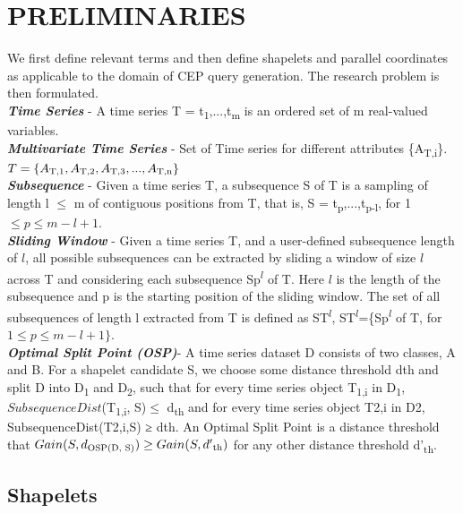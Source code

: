 \documentclass[letterpaper, 10 pt, conference]{IEEEtran}  %
\begin{document}
\section{PRELIMINARIES}
We first define relevant terms and then define shapelets and parallel coordinates as applicable to the domain of CEP query generation. The research problem is then formulated.
\medskip\\
\textbf{\textit{Time Series}} - A time series T = t\textsubscript{1},...,t\textsubscript{m} is an ordered set of m real-valued variables.\\ 
\textbf{\textit{Multivariate Time Series}} - Set of Time series for different attributes \{A\textsubscript{T,i}\}. \(T = \{A\textsubscript{T,1},A\textsubscript{T,2},A\textsubscript{T,3},...,A\textsubscript{T,n}\}\)\\
\textbf{\textit{Subsequence}} - Given a time series T, a subsequence S of T is a sampling of length l \(\leq\) m of contiguous positions from T, that is, S = t\textsubscript{p},...,t\textsubscript{p-l}, for 1 \(\leq p \leq m - l + 1\).\\
\textbf{\textit{Sliding Window}} - Given a time series T, and a user-defined subsequence length of \(l\), all possible subsequences can be extracted by sliding a window of size  \(l\) across T and considering each subsequence Sp\textsuperscript{\(l\)} of T. Here \(l\) is the length of the subsequence and p is the starting position of the sliding window. The set of all subsequences of length l extracted from T is defined as ST\textsuperscript{\(l\)}, ST\textsuperscript{\(l\)}=\{Sp\textsuperscript{\(l\)} of T, for \(1 \leq p \leq m - l + 1\}\).\\
\textbf{\textit{Optimal Split Point (OSP)}}- A time series dataset D consists of two classes, A and B. For a shapelet candidate S, we choose some distance threshold dth and split D into D\textsubscript{1} and D\textsubscript{2}, such that for every time series object T\textsubscript{1,i} in D\textsubscript{1}, \(SubsequenceDist\)(T\textsubscript{1,i}, S)\(\leq\) d\textsubscript{th} and for every time series object T2,i in D2, SubsequenceDist(T2,i,S) ≥ dth. An Optimal Split Point is a distance threshold that \(Gain(S, d\textsubscript{OSP(D, S)}) \geq Gain(S, d'\textsubscript{th})\) for any other distance threshold d'\textsubscript{th}.

\subsection{Shapelets}
\end{document}

